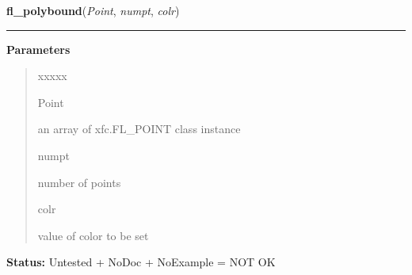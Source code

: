 \hspace{.8\funcindent}\begin{boxedminipage}{\funcwidth}

    \raggedright \textbf{fl\_polybound}(\textit{Point}, \textit{numpt}, \textit{colr})

    \vspace{-1.5ex}

    \rule{\textwidth}{0.5\fboxrule}
\setlength{\parskip}{2ex}
\setlength{\parskip}{1ex}
      \textbf{Parameters}
      \vspace{-1ex}

      \begin{quote}
        \begin{Ventry}{xxxxx}

          \item[Point]

          an array of xfc.FL\_POINT class instance

          \item[numpt]

          number of points

          \item[colr]

          value of color to be set

        \end{Ventry}

      \end{quote}

\textbf{Status:} Untested + NoDoc + NoExample = NOT OK



    \end{boxedminipage}

    \label{xformslib:library:fl_lines}

    \vspace{0.5ex}

